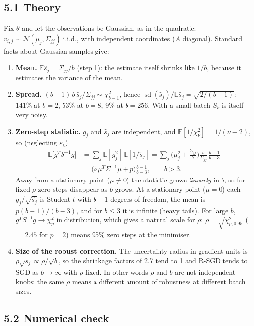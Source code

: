 \documentclass[11pt,a4paper]{article}
\newcommand{\E}{\mathbb{E}}
\begin{document}
\subsection*{5.1 Theory}

Fix $\theta$ and let the observations be Gaussian, as in the quadratic:
$v_{i,j}\sim\mathcal N(\mu_j,\Sigma_{jj})$ i.i.d., with independent coordinates
($A$ diagonal). Standard facts about Gaussian samples give:
\begin{enumerate}
\item \textbf{Mean.} $\E\widehat s_j=\Sigma_{jj}/b$ (step 1): the estimate itself
shrinks like $1/b$, because it estimates the variance of the mean.
\item \textbf{Spread.} $(b-1)\,b\,\widehat s_j/\Sigma_{jj}\sim\chi^2_{b-1}$, hence
$\operatorname{sd}(\widehat s_j)/\E\widehat s_j=\sqrt{2/(b-1)}$: 141\% at $b=2$, 53\% at
$b=8$, 9\% at $b=256$. With a small batch $S_k$ is itself very noisy.
\item \textbf{Zero-step statistic.} $g_j$ and $\widehat s_j$ are independent, and
$\E[1/\chi^2_\nu]=1/(\nu-2)$, so (neglecting $\varepsilon_k$)
\begin{align*}
\E\big[g^TS^{-1}g\big]&=\sum_j\E[g_j^2]\,\E[1/\widehat s_j]
=\sum_j\Big(\mu_j^2+\frac{\Sigma_{jj}}b\Big)\frac{b}{\Sigma_{jj}}\,\frac{b-1}{b-3}\\
&=\big(b\,\mu^T\Sigma^{-1}\mu+p\big)\frac{b-1}{b-3},\qquad b>3 .
\end{align*}
Away from a stationary point ($\mu\ne0$) the statistic grows \emph{linearly} in $b$, so
for fixed $\rho$ zero steps disappear as $b$ grows. At a stationary point ($\mu=0$)
each $g_j/\sqrt{\widehat s_j}$ is Student-$t$ with $b-1$ degrees of freedom, the mean is
$p(b-1)/(b-3)$, and for $b\le3$ it is infinite (heavy tails). For large $b$,
$g^TS^{-1}g\to\chi^2_p$ in distribution, which gives a natural scale for $\rho$:
$\rho=\sqrt{\chi^2_{p,0.95}}$ ($=2.45$ for $p=2$) means 95\% zero steps at the minimiser.
\item \textbf{Size of the robust correction.} The uncertainty radius in gradient
units is $\rho\sqrt{s_j}\propto\rho/\sqrt b$, so the shrinkage factors of 2.7 tend to 1
and R-SGD tends to SGD as $b\to\infty$ with $\rho$ fixed. In other words $\rho$ and $b$
are not independent knobs: the same $\rho$ means a different amount of robustness at
different batch sizes.
\end{enumerate}

\subsection*{5.2 Numerical check}
\end{document}
